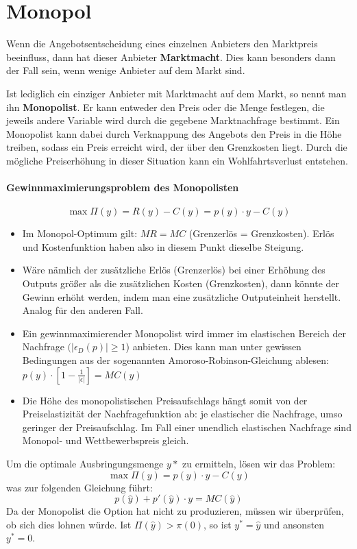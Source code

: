 \chapter{Monopol}

Wenn die Angebotsentscheidung eines einzelnen Anbieters den Marktpreis beeinfluss, dann hat dieser Anbieter \textbf{Marktmacht}. Dies kann besonders dann der Fall sein, wenn wenige Anbieter auf dem Markt sind. ~\bigskip

Ist lediglich ein einziger Anbieter mit Marktmacht auf dem Markt, so nennt man ihn \textbf{Monopolist}. Er kann entweder den Preis oder die Menge festlegen, die jeweils andere Variable wird durch die gegebene Marktnachfrage bestimmt. Ein Monopolist kann dabei durch Verknappung des Angebots den Preis in die Höhe treiben, sodass ein Preis erreicht wird, der über den Grenzkosten liegt. Durch die mögliche Preiserhöhung in dieser Situation kann ein Wohlfahrtsverlust entstehen.

\subsubsection*{Gewinnmaximierungsproblem des Monopolisten}
$$\max \Pi(y) = R(y) - C(y) = p(y) \cdot y - C(y)$$
\begin{itemize}
	\item Im Monopol-Optimum gilt: $MR = MC$ (Grenzerlös = Grenzkosten). Erlös und Kostenfunktion haben also in diesem Punkt dieselbe Steigung.
	\item Wäre nämlich der zusätzliche Erlös (Grenzerlös) bei einer Erhöhung des Outputs größer als die zusätzlichen Kosten (Grenzkosten), dann könnte der Gewinn erhöht werden, indem man eine zusätzliche Outputeinheit herstellt. Analog für den anderen Fall.
	\item Ein gewinnmaximierender Monopolist wird immer im elastischen Bereich der Nachfrage $(|\epsilon_D(p)| \geq 1$) anbieten. Dies kann man unter gewissen Bedingungen aus der sogenannten Amoroso-Robinson-Gleichung ablesen: $p(y) \cdot \left[ 1 - \frac{1}{|\epsilon|} \right] = MC(y)$
	\item Die Höhe des monopolistischen Preisaufschlags hängt somit von der Preiselastizität der Nachfragefunktion ab: je elastischer die Nachfrage, umso geringer der Preisaufschlag. Im Fall einer unendlich elastischen Nachfrage sind Monopol- und Wettbewerbspreis gleich. 
\end{itemize} 

\begin{kr}[Monopolist]
	Um die optimale Ausbringungsmenge $y*$ zu ermitteln, lösen wir das Problem:
	$$ \max \Pi(y) = p(y) \cdot y - C(y) $$
	was zur folgenden Gleichung führt:
		$$ p(\hat{y}) + p'(\hat{y}) \cdot y = MC(\hat{y}) $$	
	Da der Monopolist die Option hat nicht zu produzieren, müssen wir überprüfen, ob sich dies lohnen würde. Ist $\Pi(\hat{y}) > \pi(0)$, so ist $y^* = \hat{y}$ und ansonsten $y^* = 0$.
\end{kr} ~\newpage

